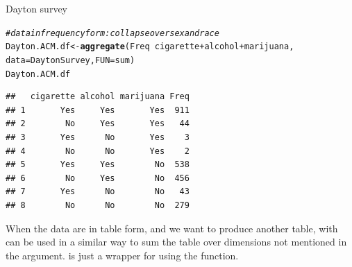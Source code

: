 \documentclass[11pt]{book}\usepackage[]{graphicx}\usepackage[]{color}
\makeatletter
\newcommand{\hlcom}[1]{\textcolor[rgb]{0.678,0.584,0.686}{\textit{#1}}}%
\newcommand{\hlopt}[1]{\textcolor[rgb]{0,0,0}{#1}}%
\newcommand{\hlstd}[1]{\textcolor[rgb]{0.345,0.345,0.345}{#1}}%
\newcommand{\hlkwb}[1]{\textcolor[rgb]{0.69,0.353,0.396}{#1}}%
\newcommand{\hlkwc}[1]{\textcolor[rgb]{0.333,0.667,0.333}{#1}}%
\newcommand{\hlkwd}[1]{\textcolor[rgb]{0.737,0.353,0.396}{\textbf{#1}}}%
\newenvironment{kframe}{%
 \def\at@end@of@kframe{}%
 \ifinner\ifhmode%
  \def\at@end@of@kframe{\end{minipage}}%
  \begin{minipage}{\columnwidth}%
 \fi\fi%
 \def\FrameCommand##1{\hskip\@totalleftmargin \hskip-\fboxsep
 \colorbox{shadecolor}{##1}\hskip-\fboxsep
     \hskip-\linewidth \hskip-\@totalleftmargin \hskip\columnwidth}%
 \MakeFramed {\advance\hsize-\width
   \@totalleftmargin\z@ \linewidth\hsize
   \@setminipage}}%
 {\par\unskip\endMakeFramed%
 \at@end@of@kframe}
\newenvironment{knitrout}{}{} %
\renewenvironment{knitrout}{\small\renewcommand{\baselinestretch}{.85}}{} %
\makeatother
\begin{document}
\begin{Example}[dayton1]{Dayton survey}
\begin{knitrout}
\color{fgcolor}\begin{kframe}
\begin{alltt}
\hlcom{# data in frequency form: collapse over sex and race}
\hlstd{Dayton.ACM.df} \hlkwb{<-} \hlkwd{aggregate}\hlstd{(Freq} \hlopt{~} \hlstd{cigarette}\hlopt{+}\hlstd{alcohol}\hlopt{+}\hlstd{marijuana,}
                           \hlkwc{data}\hlstd{=DaytonSurvey,} \hlkwc{FUN}\hlstd{=sum)}
\hlstd{Dayton.ACM.df}
\end{alltt}
\begin{verbatim}
##   cigarette alcohol marijuana Freq
## 1       Yes     Yes       Yes  911
## 2        No     Yes       Yes   44
## 3       Yes      No       Yes    3
## 4        No      No       Yes    2
## 5       Yes     Yes        No  538
## 6        No     Yes        No  456
## 7       Yes      No        No   43
## 8        No      No        No  279
\end{verbatim}
\end{kframe}
\end{knitrout}

\end{Example}

When the data are in table form, and we want to produce another
table,  with  can be used in a similar way
to sum the table over dimensions not mentioned in the 
argument.   is just a wrapper for 
using the  function.
\end{document}
